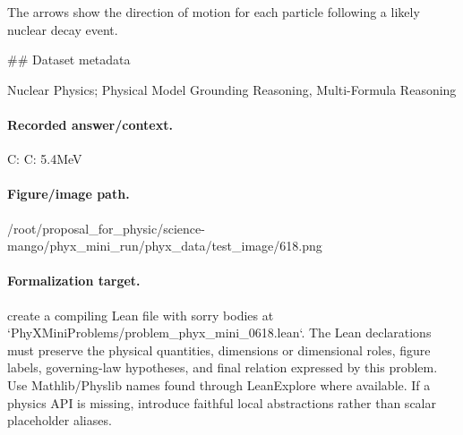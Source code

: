 The arrows show the direction of motion for each particle following a likely nuclear decay event.

\#\# Dataset metadata

Nuclear Physics; Physical Model Grounding Reasoning, Multi-Formula Reasoning

\paragraph{Recorded answer/context.}
C: C: 5.4MeV

\paragraph{Figure/image path.}
/root/proposal\_for\_physic/science-mango/phyx\_mini\_run/phyx\_data/test\_image/618.png

\paragraph{Formalization target.}
create a compiling Lean file with sorry bodies at `PhyXMiniProblems/problem\_phyx\_mini\_0618.lean`. The Lean declarations must preserve the physical quantities, dimensions or dimensional roles, figure labels, governing-law hypotheses, and final relation expressed by this problem.
Use Mathlib/Physlib names found through LeanExplore where available. If a physics API is missing, introduce faithful local abstractions rather than scalar placeholder aliases.


